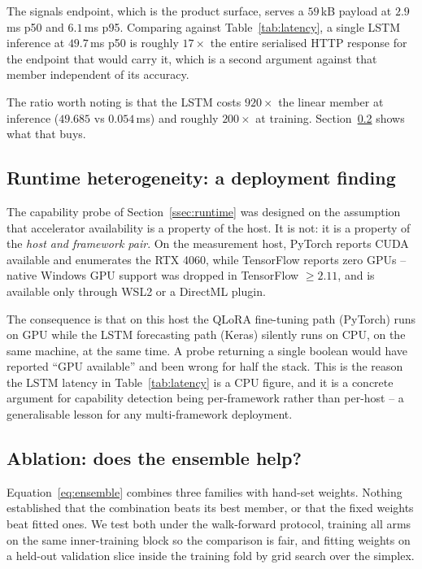 \documentclass[preprint,12pt,authoryear]{elsarticle}
\begin{document}
The signals endpoint, which is the product surface, serves a $59$\,kB payload at
$2.9$\,ms p50 and $6.1$\,ms p95. Comparing against Table~\ref{tab:latency}, a
single LSTM inference at $49.7$\,ms p50 is roughly $17\times$ the entire
serialised HTTP response for the endpoint that would carry it, which is a second
argument against that member independent of its accuracy.

The ratio worth noting is that the LSTM costs $920\times$ the linear member at
inference ($49.685$ vs $0.054$\,ms) and roughly $200\times$ at training.
Section~\ref{ssec:ablation} shows what that buys.

\subsection{Runtime heterogeneity: a deployment finding}
\label{ssec:heterogeneity}

The capability probe of Section~\ref{ssec:runtime} was designed on the assumption
that accelerator availability is a property of the host. It is not: it is a
property of the \emph{host and framework pair}. On the measurement host, PyTorch
reports CUDA available and enumerates the RTX 4060, while TensorFlow reports zero
GPUs -- native Windows GPU support was dropped in TensorFlow $\ge 2.11$, and is
available only through WSL2 or a DirectML plugin.

The consequence is that on this host the QLoRA fine-tuning path (PyTorch) runs on
GPU while the LSTM forecasting path (Keras) silently runs on CPU, on the same
machine, at the same time. A probe returning a single boolean would have reported
``GPU available'' and been wrong for half the stack. This is the reason the LSTM
latency in Table~\ref{tab:latency} is a CPU figure, and it is a concrete argument
for capability detection being per-framework rather than per-host -- a
generalisable lesson for any multi-framework deployment.

\subsection{Ablation: does the ensemble help?}
\label{ssec:ablation}

Equation~\eqref{eq:ensemble} combines three families with hand-set weights.
Nothing established that the combination beats its best member, or that the fixed
weights beat fitted ones. We test both under the walk-forward protocol, training
all arms on the same inner-training block so the comparison is fair, and fitting
weights on a held-out validation slice inside the training fold by grid search
over the simplex.
\end{document}
